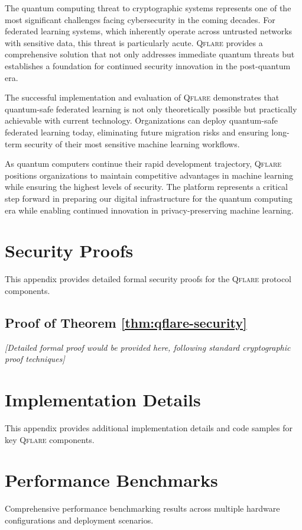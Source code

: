 ﻿\documentclass[12pt,a4paper,twoside]{book}
\newcommand{\qflare}{\textsc{Qflare}}
\begin{document}
The quantum computing threat to cryptographic systems represents one of the most significant challenges facing cybersecurity in the coming decades. For federated learning systems, which inherently operate across untrusted networks with sensitive data, this threat is particularly acute. \qflare{} provides a comprehensive solution that not only addresses immediate quantum threats but establishes a foundation for continued security innovation in the post-quantum era.

The successful implementation and evaluation of \qflare{} demonstrates that quantum-safe federated learning is not only theoretically possible but practically achievable with current technology. Organizations can deploy quantum-safe federated learning today, eliminating future migration risks and ensuring long-term security of their most sensitive machine learning workflows.

As quantum computers continue their rapid development trajectory, \qflare{} positions organizations to maintain competitive advantages in machine learning while ensuring the highest levels of security. The platform represents a critical step forward in preparing our digital infrastructure for the quantum computing era while enabling continued innovation in privacy-preserving machine learning.

\backmatter

\appendix

\chapter{Security Proofs}
\label{app:security-proofs}

This appendix provides detailed formal security proofs for the \qflare{} protocol components.

\section{Proof of Theorem \ref{thm:qflare-security}}
\label{sec:proof-qflare-security}

\textit{[Detailed formal proof would be provided here, following standard cryptographic proof techniques]}

\chapter{Implementation Details}
\label{app:implementation}

This appendix provides additional implementation details and code samples for key \qflare{} components.

\chapter{Performance Benchmarks}
\label{app:benchmarks}

Comprehensive performance benchmarking results across multiple hardware configurations and deployment scenarios.

\printbibliography
\end{document}
